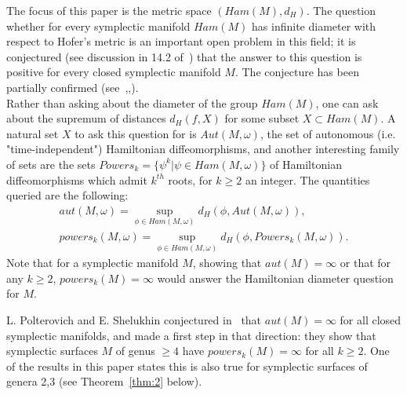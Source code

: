 \documentclass[11pt]{article}
\newenvironment{myequation}
    {
        \begin{equation*}
        \begin{gathered}
    }
    { 
        \end{gathered} 
        \end{equation*}
    }
\begin{document}
        The focus of this paper is the metric space $(Ham(M), d_H)$. The question whether for every symplectic manifold $Ham(M)$ has infinite diameter with respect to Hofer's metric is an important open problem in this field; it is conjectured (see discussion in 14.2 of~\cite{MS}) that the answer to this question is positive for every closed symplectic manifold $M$. The conjecture has been partially confirmed (see~\cite{Sc},\cite{P},\cite{MS}). \\
        
        Rather than asking about the diameter of the group $Ham(M)$, one can ask about the supremum of distances $d_H(f,X)$ for some subset $X \subset Ham(M)$. A natural set $X$ to ask this question for is $Aut(M,\omega)$, the set of autonomous (i.e. "time-independent") Hamiltonian diffeomorphisms, and another interesting family of sets are the sets $Powers_k = \{\psi^k | \psi \in Ham(M,\omega)\}$ of Hamiltonian diffeomorphisms which admit $k^{th}$ roots, for $k \geq 2$ an integer. The quantities queried are the following:
        \begin{myequation}
            aut(M,\omega) = \sup_{\phi \in Ham(M, \omega)} d_H(\phi, Aut(M, \omega)) ,\\
            powers_k(M,\omega) = \sup_{\phi \in Ham(M, \omega)} d_H(\phi, Powers_k(M,\omega)) .
        \end{myequation}
        Note that for a symplectic manifold $M$, showing that $aut(M) = \infty$ or that for any $k \geq 2$, $powers_k(M) = \infty$ would answer the Hamiltonian diameter question for $M$.
        
        L. Polterovich and E. Shelukhin conjectured in~\cite{PS14} that $aut(M) = \infty$ for all closed symplectic manifolds, and made a first step in that direction: they show that symplectic surfaces $M$ of genus $\geq 4$ have  $powers_k(M) = \infty$ for all $k \geq 2$. One of the results in this paper states this is also true for symplectic surfaces of genera 2,3 (see Theorem~\ref{thm:2} below). \\
        
\end{document}
